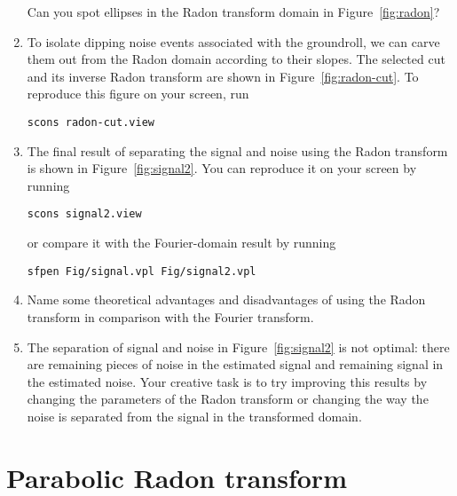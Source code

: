 \begin{enumerate}
\answer{}

Can you spot ellipses in the Radon transform domain in Figure~\ref{fig:radon}?


\item To isolate dipping noise events associated with the groundroll, we can carve them out from the Radon domain according to their slopes. The selected cut and its inverse Radon transform are shown in Figure~\ref{fig:radon-cut}. To reproduce this figure on your screen, run
\begin{verbatim}
scons radon-cut.view
\end{verbatim}

\item The final result of separating the signal and noise using the Radon transform is shown in Figure~\ref{fig:signal2}. You can reproduce it on your screen by running
\begin{verbatim}
scons signal2.view
\end{verbatim}
or compare it with the Fourier-domain result by running
\begin{verbatim}
sfpen Fig/signal.vpl Fig/signal2.vpl
\end{verbatim}

\item Name some theoretical advantages and disadvantages of using the Radon transform in comparison with the Fourier transform.

\answer{}

\item The separation of signal and noise in Figure~\ref{fig:signal2} is not optimal: there are remaining pieces of noise in the estimated signal and remaining signal in the estimated noise. Your creative task is to try improving this results by changing the parameters of the Radon transform or changing the way the noise is separated from the signal in the transformed domain.

\end{enumerate}

\lstset{language=python,numbers=left,numberstyle=\tiny,showstringspaces=false}


\section{Parabolic Radon transform}


